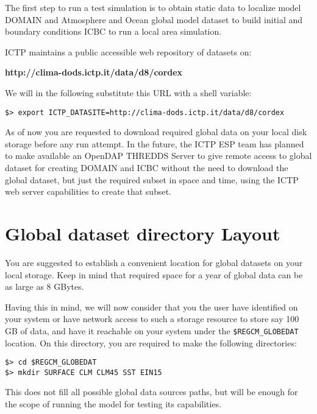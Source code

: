 %
%

The first step to run a test simulation is to obtain static data to localize
model DOMAIN and Atmosphere and Ocean global model dataset to build initial
and boundary conditions ICBC to run a local area simulation.

ICTP maintains a public accessible web repository of datasets on:

{\bf http://clima-dods.ictp.it/data/d8/cordex }

We will in the following substitute this URL with a shell variable:

\begin{Verbatim}
$> export ICTP_DATASITE=http://clima-dods.ictp.it/data/d8/cordex
\end{Verbatim}

As of now you are requested to download required global data on your local disk
storage before any run attempt. In the future, the ICTP ESP team has
planned to make available an OpenDAP THREDDS Server to give remote access
to global dataset for creating DOMAIN and ICBC without the need to
download the global dataset, but just the required subset in space and time,
using the ICTP web server capabilities to create that subset.

\section{Global dataset directory Layout}

You are suggested to establish a convenient location for global datasets
on your local storage. Keep in mind that required space for a year of global
data can be as large as 8 GBytes.

Having this in mind, we will now consider that you the user have identified
on your system or have network access to such a storage resource to store say
100 GB of data, and have it reachable on your system under the
\verb=$REGCM_GLOBEDAT= location.
On this directory, you are required to make the following directories:

\begin{Verbatim}
$> cd $REGCM_GLOBEDAT
$> mkdir SURFACE CLM CLM45 SST EIN15
\end{Verbatim}

This does not fill all possible global data sources paths, but will be enough
for the scope of running the model for testing its capabilities.

